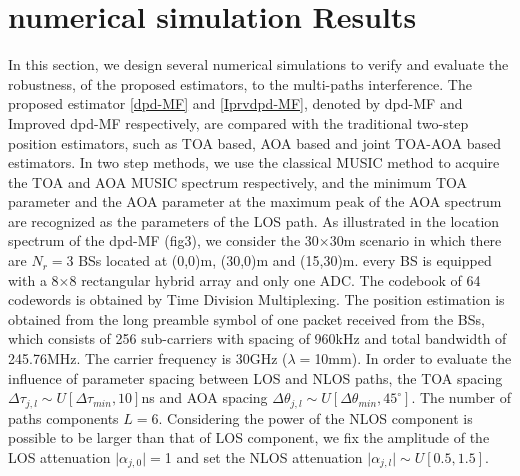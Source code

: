 \documentclass[journal]{IEEEtran}
\def \arg{\operatorname{arg}}
\begin{document}

\section{numerical simulation Results}
\label{sec:experiment}
In this section, we design several numerical simulations to verify and evaluate the robustness, of the proposed estimators, to the multi-paths interference. The proposed estimator \eqref{dpd-MF} and \eqref{Iprvdpd-MF}, denoted by dpd-MF and Improved dpd-MF respectively, are compared with the traditional two-step position estimators, such as TOA based, AOA based and joint TOA-AOA based estimators. In two step methods, we use the classical MUSIC method to acquire the TOA and AOA MUSIC spectrum respectively, and the minimum TOA parameter and the AOA parameter at the maximum peak of the AOA spectrum are recognized as the parameters of the LOS path. As illustrated in the location spectrum of the dpd-MF (fig3), we consider the 30$\times$30m scenario in which there are $N_r=$3 BSs located at (0,0)m, (30,0)m and (15,30)m. every BS is equipped with a 8$\times$8 rectangular hybrid array and only one ADC. The codebook of 64 codewords is obtained by Time Division Multiplexing. The position estimation is obtained from the long preamble symbol of one packet received from the BSs, which consists of 256 sub-carriers with spacing of 960kHz and total bandwidth of 245.76MHz. The carrier frequency is 30GHz ($\lambda=$10mm). In order to evaluate the influence of parameter spacing between LOS and NLOS paths, the TOA spacing $\Delta\tau_{j,l}\sim U[\Delta\tau_{min},10]$ns and AOA spacing $\Delta\theta_{j,l}\sim U[\Delta\theta_{min},45^\circ]$. The number of paths components $L=$6. Considering the power of the NLOS component is possible to be larger than that of LOS component, we fix the amplitude of the LOS attenuation $\vert\alpha_{j,0}\vert=$1 and set the NLOS attenuation $\vert\alpha_{j,l}\vert\sim U[0.5,1.5]$.
\end{document}
